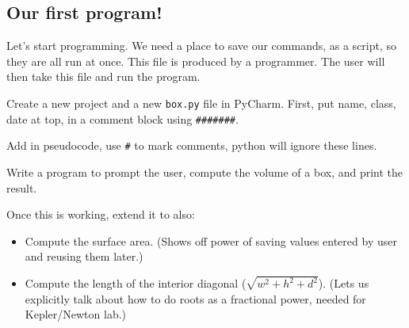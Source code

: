 \documentclass{article}
\newcommand{\eg}{\emph{e.g.}\xspace}
\newenvironment{reflect}[1]
{
  \noindent
  \begin{lrbox}{\reflectbox}
    \begin{minipage}[t]{\textwidth}
      \textbf{#1}:
}{
    \end{minipage}
  \end{lrbox}
  \fbox{\usebox{\reflectbox}}
}
\begin{document}



\subsection*{Our first program!}

Let's start programming.  We need a place to save our commands, as a
script, so they are all run at once.  This file is produced by a
programmer.  The user will then take this file and run the program.

Create a new project and a new \verb|box.py| file in PyCharm.  First,
put name, class, date at top, in a comment block using \verb|#######|.

Add in pseudocode, use \verb|#| to mark comments, python will ignore
these lines.

Write a program to prompt the user, compute the volume of a box, and
print the result.

Once this is working, extend it to also:
\begin{itemize}
\item Compute the surface area.  (Shows off power of saving values
  entered by user and reusing them later.)
\item Compute the length of the interior diagonal
  ($\sqrt{w^2 + h^2 + d^2}$).  (Lets us explicitly talk about how to do
  roots as a fractional power, needed for Kepler/Newton lab.)
\end{itemize}
\end{document}
